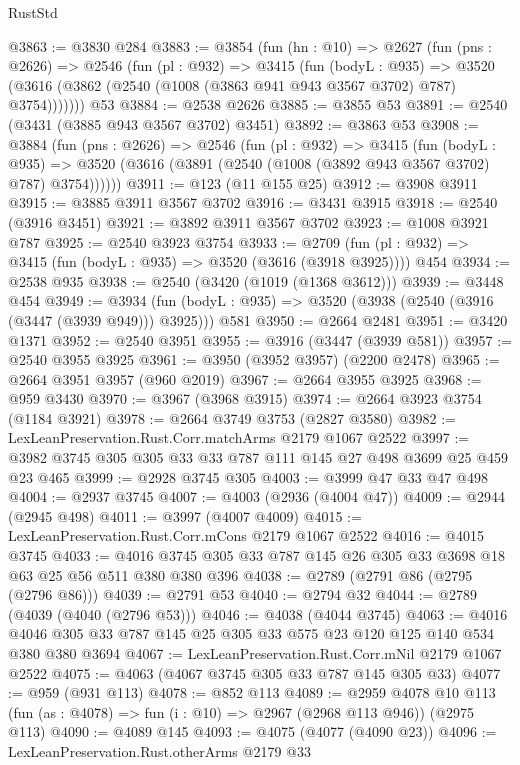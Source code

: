 \begin{lexlean}{RustStd}
\begin{coremodule}
@3863 := @3830 @284
@3883 := @3854
    (fun (hn : @10) =>
    @2627
      (fun (pns : @2626) =>
      @2546
        (fun (pl : @932) =>
        @3415
          (fun (bodyL : @935) =>
          @3520 (@3616 (@3862 (@2540 (@1008 (@3863 @941 @943 @3567 @3702) @787) @3754)))))))
    @53
@3884 := @2538 @2626
@3885 := @3855 @53
@3891 := @2540 (@3431 (@3885 @943 @3567 @3702) @3451)
@3892 := @3863 @53
@3908 := @3884
    (fun (pns : @2626) =>
    @2546
      (fun (pl : @932) =>
      @3415
        (fun (bodyL : @935) =>
        @3520 (@3616 (@3891 (@2540 (@1008 (@3892 @943 @3567 @3702) @787) @3754))))))
@3911 := @123 (@11 @155 @25)
@3912 := @3908 @3911
@3915 := @3885 @3911 @3567 @3702
@3916 := @3431 @3915
@3918 := @2540 (@3916 @3451)
@3921 := @3892 @3911 @3567 @3702
@3923 := @1008 @3921 @787
@3925 := @2540 @3923 @3754
@3933 := @2709 (fun (pl : @932) => @3415 (fun (bodyL : @935) => @3520 (@3616 (@3918 @3925)))) @454
@3934 := @2538 @935
@3938 := @2540 (@3420 (@1019 (@1368 @3612)))
@3939 := @3448 @454
@3949 := @3934 (fun (bodyL : @935) => @3520 (@3938 (@2540 (@3916 (@3447 (@3939 @949))) @3925))) @581
@3950 := @2664 @2481
@3951 := @3420 @1371
@3952 := @2540 @3951
@3955 := @3916 (@3447 (@3939 @581))
@3957 := @2540 @3955 @3925
@3961 := @3950 (@3952 @3957) (@2200 @2478)
@3965 := @2664 @3951 @3957 (@960 @2019)
@3967 := @2664 @3955 @3925
@3968 := @959 @3430
@3970 := @3967 (@3968 @3915)
@3974 := @2664 @3923 @3754 (@1184 @3921)
@3978 := @2664 @3749 @3753 (@2827 @3580)
@3982 := LexLeanPreservation.Rust.Corr.matchArms @2179 @1067 @2522
@3997 := @3982 @3745 @305 @305 @33 @33 @787 @111 @145 @27 @498 @3699 @25 @459 @23 @465
@3999 := @2928 @3745 @305
@4003 := @3999 @47 @33 @47 @498
@4004 := @2937 @3745
@4007 := @4003 (@2936 (@4004 @47))
@4009 := @2944 (@2945 @498)
@4011 := @3997 (@4007 @4009)
@4015 := LexLeanPreservation.Rust.Corr.mCons @2179 @1067 @2522
@4016 := @4015 @3745
@4033 := @4016 @3745 @305 @33 @787 @145 @26 @305 @33 @3698 @18 @63 @25 @56 @511 @380 @380 @396
@4038 := @2789 (@2791 @86 (@2795 (@2796 @86)))
@4039 := @2791 @53
@4040 := @2794 @32
@4044 := @2789 (@4039 (@4040 (@2796 @53)))
@4046 := @4038 (@4044 @3745)
@4063 := @4016 @4046 @305 @33 @787 @145 @25 @305 @33 @575 @23 @120 @125 @140 @534 @380 @380 @3694
@4067 := LexLeanPreservation.Rust.Corr.mNil @2179 @1067 @2522
@4075 := @4063 (@4067 @3745 @305 @33 @787 @145 @305 @33)
@4077 := @959 (@931 @113)
@4078 := @852 @113
@4089 := @2959
    @4078
    @10
    @113
    (fun (as : @4078) => fun (i : @10) => @2967 (@2968 @113 @946))
    (@2975 @113)
@4090 := @4089 @145
@4093 := @4075 (@4077 (@4090 @23))
@4096 := LexLeanPreservation.Rust.otherArms @2179 @33

\end{coremodule}
\end{lexlean}
